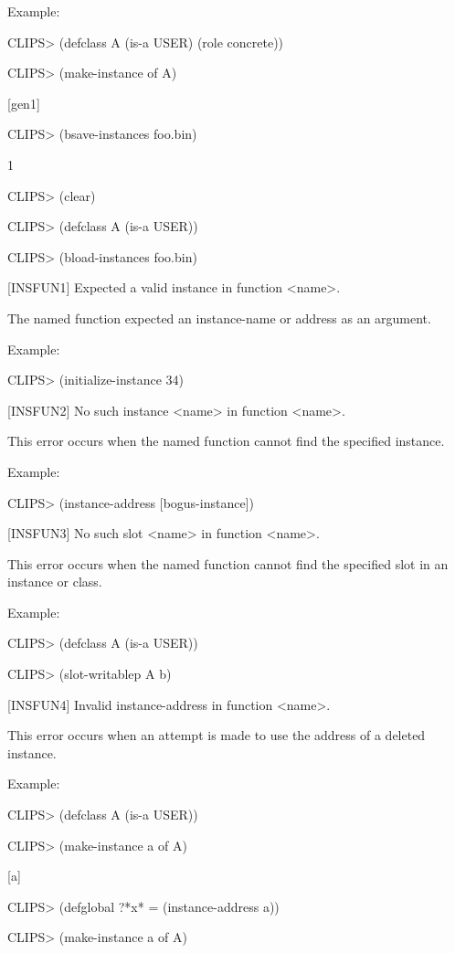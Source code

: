 \documentclass[letterpaper,10pt,english]{sphinxmanual}
\begin{document}
Example:

CLIPS\textgreater{} (defclass A (is-a USER) (role concrete))

CLIPS\textgreater{} (make-instance of A)

{[}gen1{]}

CLIPS\textgreater{} (bsave-instances foo.bin)

1

CLIPS\textgreater{} (clear)

CLIPS\textgreater{} (defclass A (is-a USER))

CLIPS\textgreater{} (bload-instances foo.bin)

{[}INSFUN1{]} Expected a valid instance in function \textless{}name\textgreater{}.

The named function expected an instance-name or address as an argument.

Example:

CLIPS\textgreater{} (initialize-instance 34)

{[}INSFUN2{]} No such instance \textless{}name\textgreater{} in function \textless{}name\textgreater{}.

This error occurs when the named function cannot find the specified
instance.

Example:

CLIPS\textgreater{} (instance-address {[}bogus-instance{]})

{[}INSFUN3{]} No such slot \textless{}name\textgreater{} in function \textless{}name\textgreater{}.

This error occurs when the named function cannot find the specified slot
in an instance or class.

Example:

CLIPS\textgreater{} (defclass A (is-a USER))

CLIPS\textgreater{} (slot-writablep A b)

{[}INSFUN4{]} Invalid instance-address in function \textless{}name\textgreater{}.

This error occurs when an attempt is made to use the address of a
deleted instance.

Example:

CLIPS\textgreater{} (defclass A (is-a USER))

CLIPS\textgreater{} (make-instance a of A)

{[}a{]}

CLIPS\textgreater{} (defglobal ?*x* = (instance-address a))

CLIPS\textgreater{} (make-instance a of A)
\end{document}
